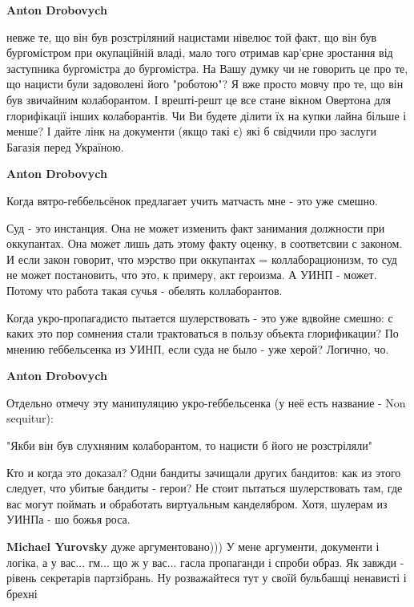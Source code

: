 \begin{itemize}
\begin{itemize}

\textbf{Anton Drobovych} 

невже те, що він був розстріляний нацистами нівелює той факт, що він був
бургомістром при окупаційній владі, мало того отримав кар'єрне зростання від
заступника бургомістра до бургомістра. На Вашу думку чи не говорить це про те,
що нацисти були задоволені його "роботою"? Я вже просто мовчу про те, що він
був звичайним колаборантом. І врешті-решт це все стане вікном Овертона для
глорифікації інших колаборантів. Чи Ви будете ділити їх на купки лайна більше і
менше? І дайте лінк на документи (якщо такі є) які б свідчили про заслуги
Багазія перед Україною.

\textbf{Anton Drobovych}

Когда вятро-геббельсёнок предлагает учить матчасть мне - это уже смешно.

Суд - это инстанция. Она не может изменить факт занимания должности при
оккупантах. Она может лишь дать этому факту оценку, в соответсвии с законом. И
если закон говорит, что мэрство при оккупантах = коллаборационизм, то суд не
может постановить, что это, к примеру, акт героизма. А УИНП - может. Потому что
работа такая сучья - обелять коллаборантов.

Когда укро-пропагадисто пытается шулерствовать - это уже вдвойне смешно: с
каких это пор сомнения стали трактоваться в пользу объекта глорификации? По
мнению геббельсенка из УИНП, если суда не было - уже херой? Логично, чо.

\textbf{Anton Drobovych}

Отдельно отмечу эту манипуляцию укро-геббельсенка (у неё есть название - Non
sequitur):

"Якби він був слухняним колаборантом, то нацисти б його не розстріляли"

Кто и когда это доказал? Одни бандиты зачищали других бандитов: как из этого
следует, что убитые бандиты - герои? Не стоит пытаться шулерствовать там, где
вас могут поймать и обработать виртуальным канделябром. Хотя, шулерам из УИНПа
- шо божья роса.

\textbf{Michael Yurovsky} дуже аргументовано))) У мене аргументи, документи і логіка, а у вас... гм... що ж у вас... гасла пропаганди і спроби образ. Як завжди - рівень секретарів партзібрань. Ну розважайтеся тут у своїй бульбашці ненависті і брехні


\end{itemize}
\end{itemize}

